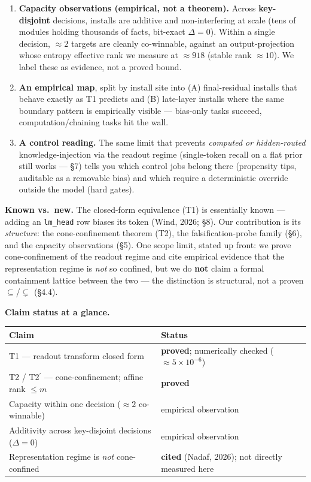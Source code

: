 \documentclass[11pt]{article}
\theoremstyle{plain}
\theoremstyle{definition}
\begin{document}
\begin{enumerate}
\item \textbf{Capacity observations (empirical, not a theorem).} Across \textbf{key-disjoint} decisions, installs are additive and non-interfering at scale (tens of modules holding thousands of facts, bit-exact $\Delta=0$). Within a single decision, $\approx2$ targets are cleanly co-winnable, against an output-projection whose entropy effective rank we measure at $\approx918$ (stable rank $\approx10$). We label these as evidence, not a proved bound.

\item \textbf{An empirical map}, split by install site into (A) final-residual installs that behave exactly as T1 predicts and (B) late-layer installs where the same boundary pattern is empirically visible --- bias-only tasks succeed, computation/chaining tasks hit the wall.

\item \textbf{A control reading.} The same limit that prevents \emph{computed or hidden-routed} knowledge-injection via the readout regime (single-token recall on a flat prior still works --- \S7) tells you which control jobs belong there (propensity tips, auditable as a removable bias) and which require a deterministic override outside the model (hard gates).
\end{enumerate}

\textbf{Known vs.\ new.} The closed-form equivalence (T1) is essentially known --- adding an \texttt{lm\_head} row biases its token (Wind, 2026; \S8). Our contribution is its \emph{structure}: the cone-confinement theorem (T2), the falsification-probe family (\S6), and the capacity observations (\S5). One scope limit, stated up front: we prove cone-confinement of the readout regime and cite empirical evidence that the representation regime is \emph{not} so confined, but we do \textbf{not} claim a formal containment lattice between the two --- the distinction is structural, not a proven $\subseteq$/$\subsetneq$ (\S4.4).

\textbf{Claim status at a glance.}

\begin{table}[ht]
\centering
\footnotesize
\begin{tabular}{ll}
\toprule
Claim & Status \\
\midrule
T1 --- readout transform closed form & \textbf{proved}; numerically checked ($\approx5\times10^{-6}$) \\
T2 / T2$^{\prime}$ --- cone-confinement; affine rank $\le m$ & \textbf{proved} \\
Capacity within one decision ($\approx2$ co-winnable) & empirical observation \\
Additivity across key-disjoint decisions ($\Delta=0$) & empirical observation \\
Representation regime is \emph{not} cone-confined & \textbf{cited} (Nadaf, 2026); not directly measured here \\
\bottomrule
\end{tabular}
\end{table}
\end{document}
